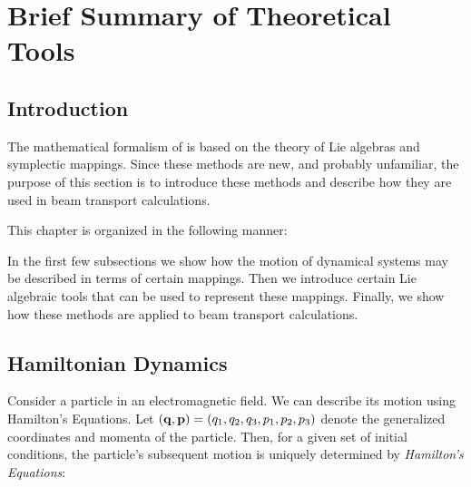
\chapter{Brief Summary of Theoretical Tools}

\section{Introduction}

     The mathematical formalism of \Mary is based on the theory of Lie
algebras and symplectic mappings.  Since these methods are new, and
probably unfamiliar, the purpose of this section is to introduce these
methods and describe how they are used in beam transport calculations.

     This chapter is organized in the following manner:

\vspace{7mm}
     In the first few subsections we show how the motion of dynamical
systems may be described in terms of certain mappings.  Then we introduce
certain Lie algebraic tools that can be used to represent these mappings.
Finally, we show how these methods are applied to beam transport
calculations.


\section{Hamiltonian Dynamics}
\label{hamiltonian}
     Consider a particle in an electromagnetic field.  We can describe its
motion using Hamilton's Equations.  Let $({\bf q},{\bf p}) = (q_1,q_2,q_3,p_1,p_2,p_3)$ denote
the generalized coordinates and momenta of the particle.  Then, for a given
set of initial conditions, the particle's subsequent motion is uniquely
determined by {\em Hamilton's Equations}:

